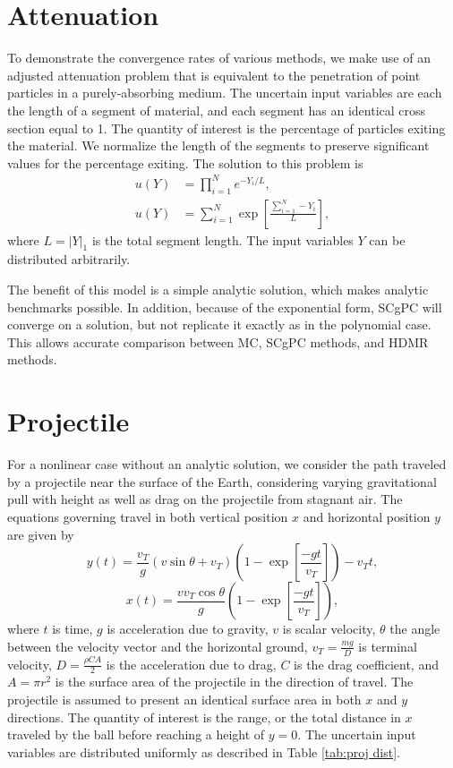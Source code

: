 \section{Attenuation}
To demonstrate the convergence rates of various methods, we make use of an adjusted attenuation problem that
is equivalent to the penetration of point particles in a purely-absorbing medium.  The uncertain input
variables are each the length of a segment of material, and each segment has an identical cross section equal
to 1.  The quantity of
interest is the percentage of particles exiting the material.  We normalize the length of the segments to
preserve significant values for the percentage exiting.  The solution to this problem is
\begin{align}
  u(Y) &= \prod_{i=1}^N e^{-Y_i/L},\\
  u(Y) &= \sum_{i=1}^N \exp\left[\frac{\sum_{i=1}^N -Y_i}{L}\right],
\end{align}
where $L=|Y|_1$ is the total segment length.  The input variables $Y$ can be distributed arbitrarily.

The benefit of this model is a simple analytic solution, which makes analytic benchmarks possible.  In
addition, because of the exponential form, SCgPC will converge on a solution, but not replicate it exactly as
in the polynomial case.  This allows accurate comparison between MC, SCgPC methods, and HDMR methods.




\section{Projectile}
For a nonlinear case without an analytic solution, we consider the path traveled by a projectile near the
surface of the Earth, considering varying gravitational pull with height as well as drag on the projectile
from stagnant air.  The equations governing travel in both vertical position $x$ and horizontal position $y$
are given by
\begin{equation}
  y(t) = \frac{v_T}{g}(v\sin\theta+v_T)\left(1-\exp\left[\frac{-gt}{v_T}\right]\right)-v_T t,
\end{equation}
\begin{equation}
  x(t) = \frac{vv_T\cos\theta}{g}\left(1-\exp\left[\frac{-gt}{v_T}\right]\right),
\end{equation}
where $t$ is time, $g$ is acceleration due to gravity, $v$ is scalar velocity, $\theta$ the angle between the
velocity vector and the horizontal ground, $v_T=\frac{mg}{D}$ is terminal velocity, $D=\frac{\rho CA}{2}$ is
the acceleration due to drag, $C$ is the drag coefficient, and $A=\pi r^2$
is the surface area of the projectile in the direction of travel.  The projectile is assumed to present an
identical surface area in both $x$ and $y$ directions.  The quantity of interest is the range, or the total
distance in $x$ traveled by the ball before reaching a height of $y=0$.  The uncertain input variables are
distributed uniformly as described in Table \ref{tab:proj dist}.

